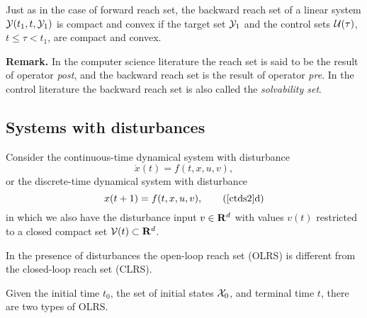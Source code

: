 Just as in the case of forward reach set, the backward reach set of
a linear system $\YY(t_1, t, \YY_1)$ is compact and convex if the target set $\YY_1$ and the control sets
$\UU(\tau)$, $t\leq\tau<t_1$, are compact and convex.

{\bf Remark.}
In the computer science literature the reach set is said to be the result
of operator \emph{post}, and the backward reach set is the result of
operator \emph{pre}.
In the control literature the backward reach set is also called the
\emph{solvability set}.
































\subsection{Systems with disturbances}\label{subsec_sysdist}
Consider the continuous-time dynamical system with disturbance
\begin{equation}
\dot{x}(t) = f(t, x, u, v),
\label{ctds2}
\end{equation}
or the discrete-time dynamical system with disturbance
\begin{equation}
x(t+1) = f(t, x, u, v),
\tag*{(\ref{ctds2}d)}
\label{dtds2}
\end{equation}
in which
we also have the disturbance input $v\in{\bf R}^d$ with values $v(t)$  restricted
to a closed compact set $\VV(t)\subset{\bf R}^d$.

In the presence of disturbances the open-loop reach set (OLRS) is different from the
closed-loop reach set (CLRS).

Given the initial time $t_0$, the set of initial states $\XX_0$, and
terminal time $t$, there are two types of OLRS.

